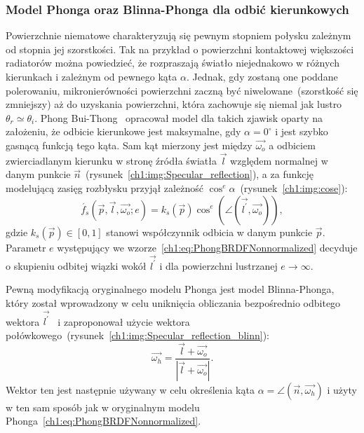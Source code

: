 \subsubsection{Model Phonga oraz Blinna-Phonga dla odbić kierunkowych}
Powierzchnie niematowe charakteryzują się pewnym stopniem połysku zależnym od stopnia jej szorstkości. Tak na przykład o powierzchni kontaktowej większości radiatorów można powiedzieć, że rozpraszają światło niejednakowo w różnych kierunkach i zależnym od pewnego kąta $\alpha$. Jednak, gdy zostaną one poddane polerowaniu, mikronierówności powierzchni zaczną być niwelowane~(szorstkość się zmniejszy) aż do uzyskania powierzchni, która zachowuje się niemal jak lustro $\theta_r \simeq \theta_i$. Phong Bui-Thong~\cite{Phong} opracował model dla takich zjawisk oparty na założeniu, że odbicie kierunkowe jest maksymalne, gdy $\alpha = 0^\circ$ i jest szybko gasnącą funkcją tego kąta. Sam kąt mierzony jest między $\vec{\omega_o}$ a odbiciem zwierciadlanym kierunku w stronę źródła światła $\vec{l}$ względem normalnej w danym punkcie $\vec{n}$~(rysunek~\ref{ch1:img:Specular_reflection}), a za funkcję modelującą zasięg rozbłysku przyjął zależność $\cos^e\alpha$~(rysunek~\ref{ch1:img:cose}):
\begin{equation}
\acute{f_s}(\vec{p}, \vec{l}, \vec{\omega_o}; e) = k_s(\vec{p})\cos^e\left(\angle(\vec{l^\prime}, \vec{\omega_o})\right),
\label{ch1:eq:PhongBRDFNonnormalized}
\end{equation}
gdzie $k_s(\vec{p})\in[0, 1]$ stanowi współczynnik odbicia w danym punkcie $\vec{p}$.
Parametr $e$ występujący we wzorze~\eqref{ch1:eq:PhongBRDFNonnormalized} decyduje o skupieniu odbitej wiązki wokół $\vec{l^\prime}$ i dla powierzchni lustrzanej $e\rightarrow\infty$.

Pewną modyfikacją oryginalnego modelu Phonga jest model Blinna-Phonga, który został wprowadzony w celu uniknięcia obliczania bezpośrednio odbitego wektora $\vec{l^\prime}$~\cite{BlinnPhong} i zaproponował użycie wektora połówkowego~(rysunek~\ref{ch1:img:Specular_reflection_blinn}):
\begin{equation}
\vec{\omega_h} = \frac{\vec{l} + \vec{\omega_o}}{|\vec{l} + \vec{\omega_o}|}.
\end{equation}
Wektor ten jest następnie używany w celu określenia kąta $\alpha = \angle(\vec{n}, \vec{\omega_h})$ i użyty w ten sam sposób jak w oryginalnym modelu Phonga~\eqref{ch1:eq:PhongBRDFNonnormalized}.

